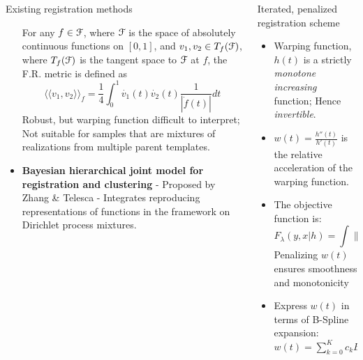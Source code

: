 \documentclass[final]{beamer}
\newlength{\onecolwid}
\begin{document}
\begin{frame}{}
\begin{columns}[t]
\begin{column}{\onecolwid}
\begin{block}{Existing registration methods}
\begin{itemize}
            For any $f \in \mathcal{F}$, where $\mathcal{F}$ is the space of absolutely continuous functions on $[0,1]$, and $v_1, v_2 \in T_f(\mathcal{F})$, where $T_f(\mathcal{F})$ is the tangent space to $\mathcal{F}$ at $f$, the F.R. metric is defined as $$\langle \langle v_1, v_2 \rangle \rangle_f = \frac{1}{4}\int_0^1\dot{v_1}(t) \dot{v_2}(t)\frac{1}{|\dot{f}(t)|}dt$$
            Robust, but warping function difficult to interpret; Not suitable for samples that are mixtures of realizations from multiple parent templates.
          \item {\bf{Bayesian hierarchical joint model for registration and clustering}} - Proposed by Zhang \& Telesca - Integrates reproducing representations of functions in the framework on Dirichlet process mixtures.          
        \end{itemize}
      \end{block}
    \end{column}

    \begin{column}{\onecolwid}\vspace{-2in}
      \begin{block}{Iterated, penalized registration scheme}
        \begin{itemize}
        \item Warping function, $h(t)$ is a strictly {\emph{monotone increasing}} function; Hence {\emph{invertible}}.
        \item $w(t) = \frac{h''(t)}{h'(t)}$ is the relative acceleration of the warping function. 
        \item The objective function is:
          \[ F_{\lambda}(y,x|h) = \int \|y(t) - x\{h(t)\} \|^2 dt + \lambda \int w^2(t) dt \]
          Penalizing $w(t)$ ensures smoothness and monotonicity
        \item Express $w(t)$ in terms of B-Spline expansion: 
          $w(t) = \sum \limits_{k=0}^{K} c_k B_k(t)$
        \end{itemize}
      \end{block}
    \end{column}


\end{columns}
\end{frame}
\end{document}
